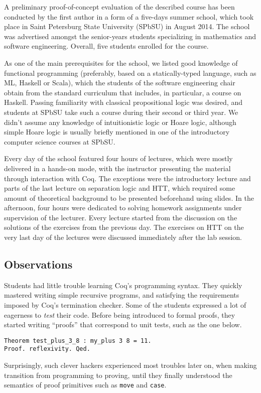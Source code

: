 \documentclass[blockstyle,preprint,nocopyrightspace]{sigplanconf}
\newcommand{\code}[1]{\lstinline{#1}}
\begin{document}
A preliminary proof-of-concept evaluation of the described course has
been conducted by the first author in a form of a five-days summer
school, which took place in Saint Petersburg State University (SPbSU)
in August 2014. The school was advertised amongst the senior-years
students specializing in mathematics and software
engineering. Overall, five students enrolled for the course.

As one of the main prerequisites for the school, we listed good
knowledge of functional programming (preferably, based on a
statically-typed language, such as ML, Haskell or Scala), which
the students of the software engineering chair obtain from the
standard curriculum that includes, in particular, a course on Haskell.
%
Passing familiarity with classical propositional logic was desired,
and students at SPbSU take such a course during their second or third
year. We didn't assume any knowledge of intuitionistic logic or Hoare
logic, although simple Hoare logic is usually briefly mentioned in one
of the introductory computer science courses at SPbSU.

Every day of the school featured four hours of lectures, which were
mostly delivered in a hands-on mode, with the instructor presenting
the material through interaction with Coq. The exceptions were the
introductory lecture and parts of the last lecture on separation logic
and HTT, which required some amount of theoretical background to be
presented beforehand using slides. In the afternoon, four hours were
dedicated to solving homework assignments under supervision of the
lecturer. Every lecture started from the discussion on the solutions
of the exercises from the previous day. The exercises on HTT on the
very last day of the lectures were discussed immediately after the lab
session.

\subsection{Observations}
\label{sec:common-observations}
Students had little trouble learning Coq's programming syntax. They
quickly mastered writing simple recursive programs, and satisfying the
requirements imposed by Coq's termination checker. Some of the
students expressed a lot of eagerness to \emph{test} their code.
Before being introduced to formal proofs, they started writing
``proofs'' that correspond to unit tests, such as the one below.
%
\begin{lstlisting}
Theorem test_plus_3_8 : my_plus 3 8 = 11.
Proof. reflexivity. Qed.
\end{lstlisting}
%
Surprisingly, such clever hackers experienced most troubles later on,
when making transition from programming to proving, until they finally
understood the semantics of proof primitives such as \code{move} and
\code{case}.
\end{document}
